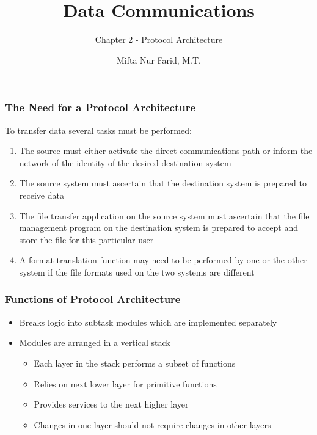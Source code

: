 \documentclass[pdflatex,compress]{beamer}
\title{Data Communications}
\subtitle{Chapter 2 - Protocol Architecture}
\author{Mifta Nur Farid, M.T.}
\begin{document}
\maketitle

\begin{frame}
	\frametitle{The Need for a Protocol Architecture}
	To transfer data several tasks must be performed:
	\begin{enumerate}
		\item The source must either activate the direct communications path or inform the network of the identity of the desired destination system
		\item The source system must ascertain that the destination system is prepared to receive data
		\item The file transfer application on the source system must ascertain that the file management program on the destination system is prepared to accept and store the file for this particular user
		\item A format translation function may need to be performed by one or the other system if the file formats used on the two systems are different
	\end{enumerate}
\end{frame}

\begin{frame}
	\frametitle{Functions of Protocol Architecture}
	\begin{itemize}
		\item Breaks logic into subtask modules which are implemented separately
		\item Modules are arranged in a vertical stack
		\begin{itemize}
			\item Each layer in the stack performs a subset of functions
			\item Relies on next lower layer for primitive functions
			\item Provides services to the next higher layer
			\item Changes in one layer should not require changes in other layers
		\end{itemize}
	\end{itemize}
\end{frame}
\end{document}
